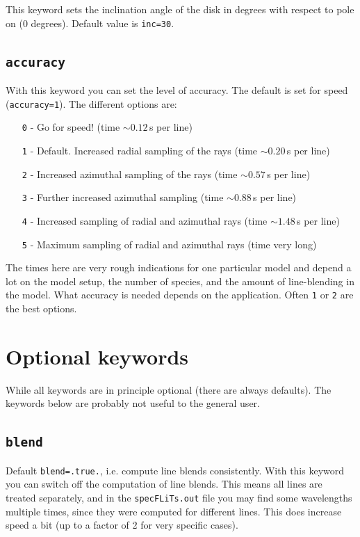 \documentclass[12pt]{article}
\begin{document}
This keyword sets the inclination angle of the disk in degrees with respect to pole on (0 degrees). Default value is \texttt{inc=30}.

\subsection*{\texttt{accuracy}}

With this keyword you can set the level of accuracy. The default is set for speed (\texttt{accuracy=1}). The different options are:
\begin{itemize}
\item[\texttt{0} -] Go for speed! (time $\sim 0.12\,$s per line)
\item[\texttt{1} -] Default. Increased radial sampling of the rays (time $\sim 0.20\,$s per line)
\item[\texttt{2} -] Increased azimuthal sampling of the rays (time $\sim 0.57\,$s per line)
\item[\texttt{3} -] Further increased azimuthal sampling (time $\sim 0.88\,$s per line)
\item[\texttt{4} -] Increased sampling of radial and azimuthal rays (time $\sim 1.48\,$s per line)
\item[\texttt{5} -] Maximum sampling of radial and azimuthal rays (time very long)
\end{itemize}
The times here are very rough indications for one particular model and depend a lot on the model setup, the number of species, and the amount of line-blending in the model. What accuracy is needed depends on the application. Often \texttt{1} or \texttt{2} are the best options.

\section{Optional keywords}

While all keywords are in principle optional (there are always defaults). The keywords below are probably not useful to the general user.

\subsection*{\texttt{blend}}

Default \texttt{blend=.true.}, i.e. compute line blends consistently. With this keyword you can switch off the computation of line blends. This means all lines are treated separately, and in the \texttt{specFLiTs.out} file you may find some wavelengths multiple times, since they were computed for different lines. This does increase speed a bit (up to a factor of 2 for very specific cases).
\end{document}
